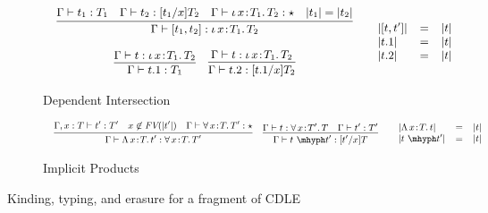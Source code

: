 \documentclass{article}
\newcommand{\abs}[4]{{#1}\, #2\! : \! #3.\, #4}
\begin{document}
\begin{figure}
\begin{subfigure}{1\linewidth}
\[\begin{array}{cr}
\begin{array}{lll}
          \end{array}
      \end{array}
    \]
  \end{subfigure}
  \begin{subfigure}{1\linewidth}
    \caption{Dependent Intersection}
    \label{sfig:cdle-depint}
    \[\small
      \begin{array}{cr}
        \begin{array}{c}
          \infer{
          \Gamma\vdash [t_1,t_2] : \abs{\iota}{x}{T_1}{T_2}
          }{
          \Gamma\vdash t_1 : T_1
          \quad \Gamma\vdash t_2 : [t_1/x]T_2
          \quad \Gamma \vdash \abs{\iota}{x}{T_1}{T_2} : \star
          \quad |t_1| = |t_2|
          }
          \\ \\
          \begin{array}{cc}
            \infer{
             \Gamma\vdash t.1 : T_1
            }{
             \Gamma\vdash t : \abs{\iota}{x}{T_1}{T_2}
            }
            &
            \infer{
             \Gamma\vdash t.2 : [t.1/x]T_2
            }{
             \Gamma\vdash t : \abs{\iota}{x}{T_1}{T_2}
            }
          \end{array}
        \end{array}
        &
          \begin{array}{lll}
            |[ t , t' ]| & = & |t|
            \\ |t.1| & = & |t|
            \\ |t.2| & = & |t|
          \end{array}
      \end{array}
    \]
  \end{subfigure}
  \begin{subfigure}{1\linewidth}
    \caption{Implicit Products}
    \label{sfig:clde-imp}
    \[\small
      \begin{array}{cr}
        \begin{array}{cc}
          \infer{
          \Gamma\vdash\abs{\Lambda}{x}{T}{t'} : \abs{\forall}{x}{T}{T'}
          }{
          \Gamma,x:T\vdash t':T'
          \quad x\not\in\textit{FV}(|t'|)
          \quad \Gamma \vdash \abs{\forall}{x}{T}{T'} : \star
          }
          &
            \infer{
            \Gamma\vdash t\ \mhyph t' : [t'/x]T
            }{
            \Gamma\vdash t : \abs{\forall}{x}{T'}{T}
            \quad \Gamma\vdash t' : T'
            }
        \end{array}
        & 
          \begin{array}{lll}
            |\abs{\Lambda}{x}{T}{t}| & = & |t|
            \\ |t\ \mhyph t'| & = & |t|
          \end{array}
      \end{array}
    \]
  \end{subfigure}
  \caption{Kinding, typing, and erasure for a fragment of CDLE}
  \label{fig:cdle-type-constructs}
\end{figure}
\end{document}

